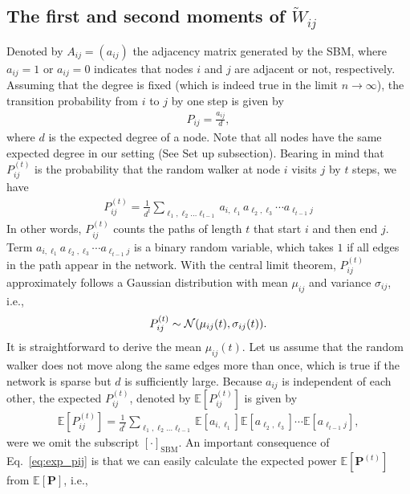 \documentclass[12pt]{article} %
\def\mat#1{\mathbf{#1}}
\def\Exp{{\mathbb E}}
\def\ie{i.e.,~}
\begin{document}
\subsection{The first and second moments of $\tilde W_{ij}$}

Denoted by $A_{ij}=(a_{ij})$ the adjacency matrix generated by the SBM, where
$a_{ij} = 1$ or $a_{ij}=0$ indicates that nodes $i$ and $j$ are adjacent or not, respectively.
Assuming that the degree is fixed (which is indeed true in the limit $n\rightarrow \infty$), the transition probability from $i$ to $j$ by one step is given by
\begin{align}
    P_{ij} = \frac{a_{ij}}{d},
\end{align}
where $d$ is the expected degree of a node.
Note that all nodes have the same expected degree in our setting (See Set up subsection).
Bearing in mind that $P^{(t)}_{ij}$ is the probability that the random walker at node $i$ visits $j$ by $t$ steps,
we have
\begin{align}
    \label{eq:pij_random}
    P^{(t)} _{ij} = \frac{1}{d^t}\sum_{\ell_1, \ell_2\ldots \ell_{t-1}} a_{i,\ell_1}a_{\ell_2,\ell_3} \cdots a_{\ell_{t-1}j}
\end{align}
In other words, $P_{ij} ^{(t)}$ counts the paths of length $t$ that start $i$ and then end $j$.
Term $a_{i,\ell_1}a_{\ell_2,\ell_3} \cdots a_{\ell_{t-1}j}$ is a binary random variable, which takes $1$ if
all edges in the path appear in the network.
With the central limit theorem, $P^{(t)}_{ij}$ approximately follows a Gaussian distribution with mean $\mu_{ij}$ and variance $\sigma_{ij}$, \ie
\begin{align}
    P^{(t)} _{ij} \sim {\cal N}(\mu_{ij}(t), \sigma_{ij}(t) ). \label{eq:norm}
\end{align}
It is straightforward to derive the mean $\mu_{ij}(t)$.
Let us assume that the random walker does not move along the same edges more than once, which is true if the network is sparse but $d$ is sufficiently large.
Because $a_{ij}$ is independent of each other, the expected $P^{(t)}_{ij}$, denoted by $\Exp\left[ P^{(t)}_{ij}\right] $ is given by
\begin{align}
    \Exp\left[ P^{(t)} _{ij} \right]  =\frac{1}{d^t}\sum_{\ell_1, \ell_2\ldots \ell_{t-1}} \Exp\left[ a_{i,\ell_1} \right] \Exp\left[ a_{\ell_2,\ell_3} \right] \cdots \Exp\left[ a_{\ell_{t-1}j} \right], \label{eq:exp_pij}
\end{align}
were we omit the subscript $[\cdot]_\text{SBM}$.
An important consequence of Eq.~\eqref{eq:exp_pij} is that we can easily calculate the expected power $\Exp\left[ \mat{P}^{(t)} \right]$ from $\Exp\left[ \mat{P} \right]$, \ie
\end{document}
